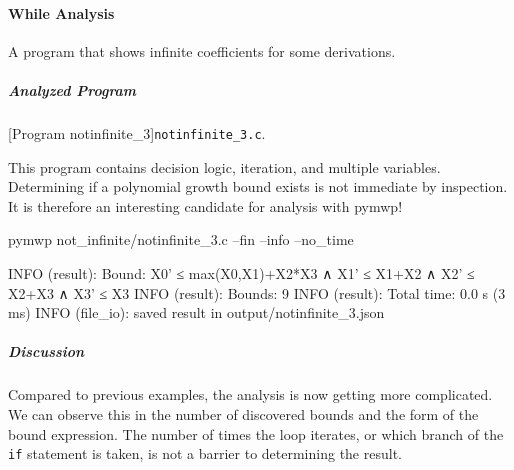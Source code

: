 \paragraph{While Analysis}\label{while-analysis}
A program that shows infinite coefficients for some derivations.

\subparagraph*{Analyzed Program}

\begin{center}
\begin{minipage}{\textwidth}
\captionsetup{type=lstlisting}
[Program notinfinite\_3]{\texttt{notinfinite\_3.c}.}
\label{lst:notinfinite3}
\end{minipage}
\end{center}

This program contains decision logic, iteration, and multiple variables.
Determining if a polynomial growth bound exists is not immediate by inspection.
It is therefore an interesting candidate for analysis with pymwp!

\begin{center}
\begin{minipage}{\textwidth}
\captionsetup{type=lstlisting}
\begin{cmdlisting}[label={lst:ex3-run-cmd}]
pymwp not_infinite/notinfinite_3.c --fin --info --no_time
\end{cmdlisting}
\end{minipage}
\end{center}

\begin{center}
\begin{minipage}{\textwidth}
\begin{outlisting}[label={lst:ex3-output}]
INFO (result): Bound: X0' ≤ max(X0,X1)+X2*X3 ∧ X1' ≤ X1+X2 ∧ X2' ≤ X2+X3 ∧ X3' ≤ X3
INFO (result): Bounds: 9
INFO (result): Total time: 0.0 s (3 ms)
INFO (file_io): saved result in output/notinfinite_3.json
\end{outlisting}
\end{minipage}
\end{center}

\subparagraph*{Discussion}\label{discussion}

Compared to previous examples, the analysis is now getting more complicated.
We can observe this in the number of discovered bounds and the form of the bound expression.
The number of times the loop iterates, or which branch of the \texttt{if} statement is taken, is not a barrier to determining the result.

